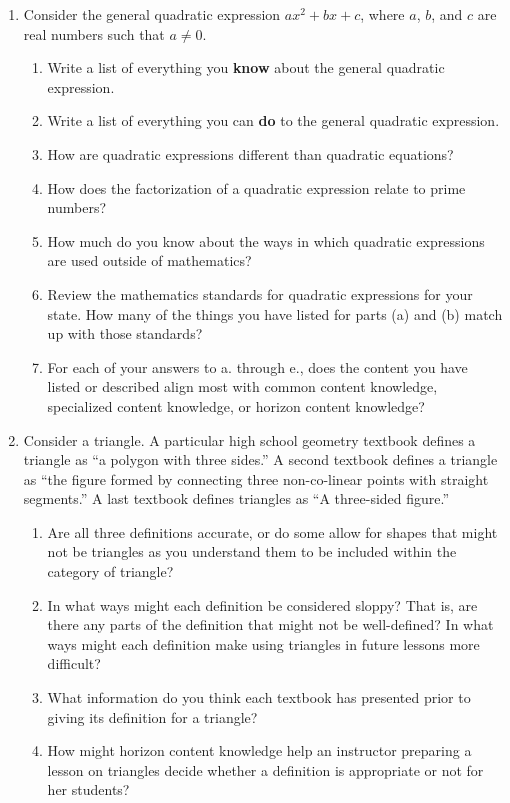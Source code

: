 \documentclass[
]{book}
\theoremstyle{definition}
\theoremstyle{definition}
\theoremstyle{definition}
\theoremstyle{remark}
\begin{document}
\begin{enumerate}
\def\labelenumi{\arabic{enumi}.}
\item
  Consider the general quadratic expression \(ax^2 + bx+c\), where \(a\), \(b\), and \(c\) are real numbers such that \(a\neq0\).

  \begin{enumerate}
  \def\labelenumii{\alph{enumii}.}
  \item
    Write a list of everything you \textbf{know} about the general quadratic expression.
  \item
    Write a list of everything you can \textbf{do} to the general quadratic expression.
  \item
    How are quadratic expressions different than quadratic equations?
  \item
    How does the factorization of a quadratic expression relate to prime numbers?
  \item
    How much do you know about the ways in which quadratic expressions are used outside of mathematics?
  \item
    Review the mathematics standards for quadratic expressions for your state. How many of the things you have listed for parts (a) and (b) match up with those standards?
  \item
    For each of your answers to a. through e., does the content you have listed or described align most with common content knowledge, specialized content knowledge, or horizon content knowledge?
  \end{enumerate}
\item
  Consider a triangle. A particular high school geometry textbook defines a triangle as ``a polygon with three sides.'' A second textbook defines a triangle as ``the figure formed by connecting three non-co-linear points with straight segments.'' A last textbook defines triangles as ``A three-sided figure.''

  \begin{enumerate}
  \def\labelenumii{\alph{enumii})}
  \item
    Are all three definitions accurate, or do some allow for shapes that might not be triangles as you understand them to be included within the category of triangle?
  \item
    In what ways might each definition be considered sloppy? That is, are there any parts of the definition that might not be well-defined? In what ways might each definition make using triangles in future lessons more difficult?
  \item
    What information do you think each textbook has presented prior to giving its definition for a triangle?
  \item
    How might horizon content knowledge help an instructor preparing a lesson on triangles decide whether a definition is appropriate or not for her students?
  \end{enumerate}
\end{enumerate}
\end{document}
